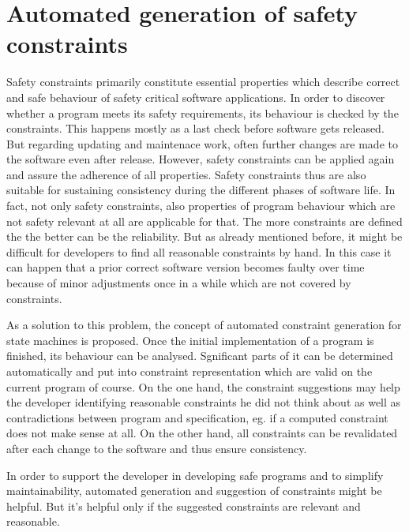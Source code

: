 \chapter{Automated generation of safety constraints}
\label{chap:automatedgenerationofsafetyconstraints}

Safety constraints primarily constitute essential properties which describe correct and safe behaviour of safety critical software applications. In order to discover whether a program meets its safety requirements, its behaviour is checked by the constraints. This happens mostly as a last check before software gets released. 
But regarding updating and maintenace work, often further changes are made to the software even after release.
However, safety constraints can be applied again and assure the adherence of all properties. Safety constraints thus are also suitable for sustaining consistency during the different phases of software life. In fact, not only safety constraints, also properties of program behaviour which are not safety relevant at all are applicable for that. The more constraints are defined the the better can be the reliability.
But as already mentioned before, it might be difficult for developers to find all reasonable %
constraints by hand. %
In this case it can happen that a prior correct software version becomes faulty over time because of minor adjustments once in a while which are not covered by constraints.

As a solution to this problem, the concept of automated constraint generation for state machines is proposed. Once the initial implementation of a program is finished, its behaviour can be analysed. Sgnificant parts of it can be determined automatically and put into constraint representation which are valid on the current program of course.
On the one hand, the constraint suggestions may help the developer identifying reasonable constraints he did not think about as well as contradictions between program and specification, eg. if a computed constraint does not make sense at all.
On the other hand, all constraints can be revalidated after each change to the software and thus ensure consistency.

In order to support the developer in developing safe programs and to simplify maintainability, automated generation and suggestion of constraints might be helpful. But it's helpful only if the suggested constraints are relevant and reasonable.


